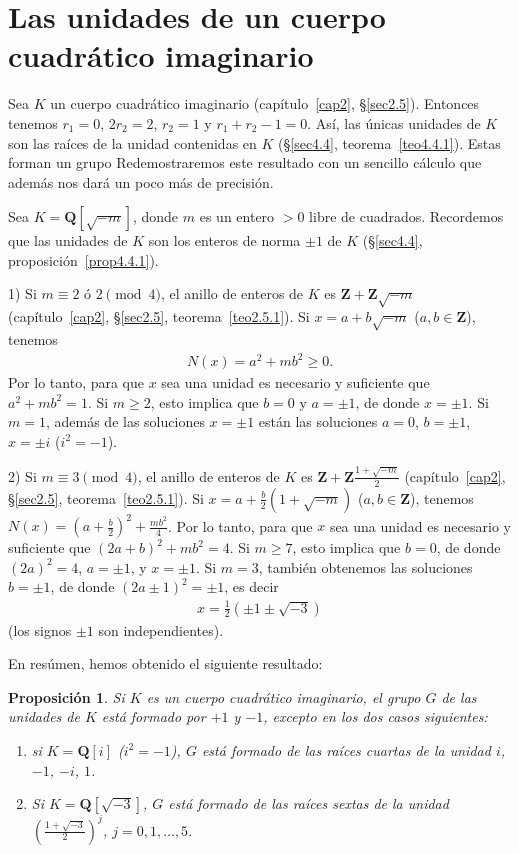 \documentclass[bibtotoc,leqno,spanish]{amsbook}
\let\emph\relax %
\newcommand{\QQ}{\mathbf{Q}}
\newcommand{\ZZ}{\mathbf{Z}}
\numberwithin{equation}{section}
\theoremstyle{note}
\theoremstyle{note}
\newtheorem{proposition}{Proposici\'on}
\theoremstyle{rem}
\numberwithin{theorem}{section}
\numberwithin{proposition}{section}
\numberwithin{definition}{section}
\numberwithin{lemma}{section}
\numberwithin{corollary}{section}
\numberwithin{example}{section}
\numberwithin{footnote}{section}%
\begin{document}
\section{Las unidades de un cuerpo cuadr\'atico imaginario}

Sea $K$ un cuerpo cuadr\'atico imaginario (cap\'itulo~\ref{cap2}, \S\ref{sec2.5}).
Entonces tenemos $r_{1}=0$, $2r_{2}=2$,
$r_{2}=1$ y $r_{1}+r_{2}-1=0$. As\'i, las \'unicas unidades de $K$ son las ra\'ices de la unidad contenidas en $K$
(\S\ref{sec4.4}, teorema~\ref{teo4.4.1}). Estas forman un grupo \emph{finito c\'iclico.} Redemostraremos este resultado con un sencillo
c\'alculo que adem\'as nos dar\'a un poco m\'as de precisi\'on.

Sea $K=\QQ[\sqrt{-m}]$, donde $m$ es un entero $>0$ libre de cuadrados. Recordemos que las unidades de $K$
son los enteros de norma $\pm 1$ de $K$ (\S\ref{sec4.4}, proposici\'on~\ref{prop4.4.1}).

1) Si $m\equiv 2\text{ \'o }2\pmod 4$, el anillo de enteros de $K$ es $\ZZ+\ZZ\sqrt{-m}$ (cap\'itulo~\ref{cap2},
\S\ref{sec2.5}, teorema~\ref{teo2.5.1}). Si $x= a+b\sqrt{-m}$ ($a,b\in\ZZ$), tenemos
\begin{gather*}
N(x) = a^{2}+mb^{2}\geq 0.
\end{gather*}
Por lo tanto, para que $x$ sea una unidad es necesario y suficiente que $a^{2}+mb^{2}=1$. Si $m\geq 2$, esto
implica que $b=0$ y $a=\pm 1$, de donde $x=\pm 1$. Si $m=1$, adem\'as de las soluciones $x=\pm 1$ est\'an
las soluciones $a=0$, $b=\pm 1$, $x=\pm i$ ($i^{2}=-1$).

2) Si $m\equiv 3\pmod 4$, el anillo de enteros de $K$ es $\ZZ+\ZZ\frac{1+\sqrt{-m}}{2}$ (cap\'itulo~\ref{cap2},
\S\ref{sec2.5}, teorema~\ref{teo2.5.1}). Si $x=a+\frac{b}{2}(1+\sqrt{-m})$ ($a,b\in\ZZ$), tenemos
$N(x) = \left(a+\frac{b}{2}\right)^{2}+\frac{mb^{2}}{4}$. Por lo tanto, para que $x$ sea una unidad es necesario y
suficiente que $(2a+b)^{2}+mb^{2}=4$. Si $m\geq 7$, esto implica que $b=0$, de donde $(2a)^{2}=4$,
$a=\pm 1$, y $x=\pm 1$. Si $m=3$, tambi\'en obtenemos las soluciones $b=\pm 1$, de donde
$(2a\pm 1)^{2}=\pm 1$, es decir
\begin{gather*}
x=\frac{1}{2}(\pm 1\pm \sqrt{-3})
\end{gather*}
(los signos $\pm 1$ son independientes).

En res\'umen, hemos obtenido el siguiente resultado:

\begin{proposition}
Si $K$ es un cuerpo cuadr\'atico imaginario, el grupo $G$ de las unidades de $K$ est\'a formado por $+1$ y
$-1$, excepto en los dos casos siguientes:
\begin{enumerate}
\item[1)] si $K=\QQ[i]$ ($i^{2}=-1$), $G$ est\'a formado de las ra\'ices cuartas de la unidad $i$, $-1$, $-i$, $1$.
\item[2)] Si $K=\QQ[\sqrt{-3}]$, $G$ est\'a formado de las ra\'ices sextas de la unidad $\left(\frac{1+\sqrt{-3}}{2}\right)^{j}$,
$j=0,1,\dots,5$.
\end{enumerate}
\end{proposition}
\end{document}
